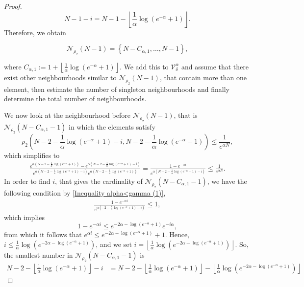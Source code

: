\documentclass[11pt, reqno]{amsart}
\theoremstyle{plain}%
\theoremstyle{definition}
\theoremstyle{definition}
\numberwithin{equation}{section}
\begin{document}
\begin{proof}
$$N-1-i= N-1-\left\lfloor\frac{1}{\alpha}\log\left(e^{-\alpha}+1\right)\right\rfloor.$$
Therefore, we obtain

$$\mathcal{N}_{\rho_2}(N-1)=\left\{N-C_{\alpha,1},\ldots,N-1\right\},$$

where $C_{\alpha,1}:=1+\left\lfloor\frac{1}{\alpha}\log\left(e^{-\alpha}+1\right)\right\rfloor$. We add this to $\mathcal{V}_\delta^{\alpha}$ and assume that there exist other neighbourhoods similar to $\mathcal{N}_{\rho_2}(N-1)$, that contain more than one element, then estimate the number of singleton neighbourhoods and finally determine the total number of neighbourhoods. 

We now look at the neighbourhood before $\mathcal{N}_{\rho_2}(N-1)$, that is $\mathcal{N}_{\rho_2}\left(N-C_{\alpha,1}-1\right)$ in which the elements satisfy
$${\rho_2}\left( N-2-\frac{1}{\alpha}\log\left(e^{-\alpha}+1\right)-i, N-2-\frac{1}{\alpha}\log\left(e^{-\alpha}+1\right)\right)\le\frac{1}{e^{\alpha N}},$$
which simplifies to
\begin{align}\label{Inequality alpha<gamma (1)}
    \frac{e^{\alpha\left(N-2-\frac{1}{\alpha}\log\left(e^{-\alpha}+1\right)\right)}-e^{\alpha\left(N-2-\frac{1}{\alpha}\log\left(e^{-\alpha}+1\right)-i\right)}}{e^{\alpha\left(N-2-\frac{1}{\alpha}\log\left(e^{-\alpha}+1\right)-i\right)}e^{\alpha\left(N-2-\frac{1}{\alpha}\log\left(e^{-\alpha}+1\right)\right)}}=\frac{1-e^{-\alpha i}}{e^{\alpha\left(N-2-\frac{1}{\alpha}\log\left(e^{-\alpha}+1\right)-i\right)}}\le \frac{1}{e^{\alpha N}}.
\end{align}
In order to find $i$, that gives the cardinality of $\mathcal{N}_{\rho_2}\left(N-C_{\alpha,1}-1\right)$, we have the following condition by \eqref{Inequality alpha<gamma (1)},
\begin{align*}
    \frac{1-e^{-\alpha i}}{e^{\alpha(-2-\frac{1}{\alpha}\log\left(e^{-\alpha}+1\right)-i)}}\le 1,
\end{align*}
which implies $$1-e^{-\alpha i}\le e^{-2\alpha-\log\left(e^{-\alpha}+1\right)}e^{-i\alpha},$$ from which it follows that $e^{\alpha i}\le e^{-2\alpha-\log\left(e^{-\alpha}+1\right)}+1 $. Hence,
$i\le \frac{1}{\alpha}\log \left(e^{-2\alpha-\log\left(e^{-\alpha}+1\right)}\right)$, and we set $i=\left\lfloor \frac{1}{\alpha}\log \left(e^{-2\alpha-\log\left(e^{-\alpha}+1\right)}\right)\right\rfloor$. So, the smallest number in $\mathcal{N}_{\rho_2}\left(N-C_{\alpha,1}-1\right)$ is 
\begin{align*}
 N-2-\left\lfloor\frac{1}{\alpha}\log\left(e^{-\alpha}+1\right)\right\rfloor-i&=  N-2-\left\lfloor\frac{1}{\alpha}\log\left(e^{-\alpha}+1\right)\right\rfloor- \left\lfloor\frac{1}{\alpha}\log \left(e^{-2\alpha-\log\left(e^{-\alpha}+1\right)}\right)\right\rfloor

\end{align*}
\end{proof}
\end{document}
